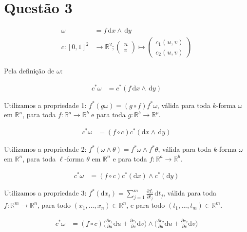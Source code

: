 \documentclass[12pt,a4paper]{article}
\begin{document}
	\section{Quest\~ao 3}
		
		\begin{align}
			\omega &= f \,\mathrm{d}x \wedge \,\mathrm{d}y \\
			c : [0,1]^2 &\rightarrow \mathbb{R}^2 ; \begin{pmatrix} u \\ v \end{pmatrix} \mapsto \begin{pmatrix} c_1(u,v) \\ c_2(u,v) \end{pmatrix}
		\end{align}		

		Pela defini\c{c}\~ao de $\omega$:
		
		\begin{align}
			c^*\omega &= c^*(f \,\mathrm{d}x \wedge \,\mathrm{d}y)
		\end{align}		
		
		Utilizamos a propriedade 1: $f^*(g \omega) = (g \circ f) f^*\omega$, v\'alida para toda $k$-forma $\omega$ em $\mathbb{R}^n$, para toda $f : \mathbb{R}^a \rightarrow \mathbb{R}^b$ e para toda $g : \mathbb{R}^b \rightarrow \mathbb{R}^p$.

		\begin{align}
			c^*\omega &= (f \circ c) c^*(\mathrm{d}x \wedge \,\mathrm{d}y)
		\end{align}		
		
		Utilizamos a propriedade 2: $f^*(\omega \wedge \theta) = f^*\omega \wedge f^*\theta$, v\'alida para toda $k$-forma $\omega$ em $\mathbb{R}^n$, para toda $\ell$-forma $\theta$ em $\mathbb{R}^n$ e para toda $f : \mathbb{R}^a \rightarrow \mathbb{R}^b$.
		
		\begin{align}
			c^*\omega &= (f \circ c) c^*(\mathrm{d}x) \wedge c^*(\mathrm{d}y)
		\end{align}		
		
		Utilizamos a propriedade 3: $f^*(\mathrm{d}x_i) = \sum_{j = 1}^m \frac{\partial f_i}{\partial t_j} \,\mathrm{d}t_j$, v\'alida para toda $f : \mathbb{R}^m \rightarrow \mathbb{R}^n$, para todo $(x_1, ..., x_n) \in \mathbb{R}^n$, e para todo $(t_1, ..., t_m) \in \mathbb{R}^m$.
		
		\begin{align}
			c^*\omega &= (f \circ c) \biggl(\frac{\partial c_1}{\partial u}\mathrm{d}u + \frac{\partial c_1}{\partial v}\mathrm{d}v\biggl) \wedge \biggl(\frac{\partial c_2}{\partial u}\mathrm{d}u + \frac{\partial c_2}{\partial v}\mathrm{d}v \biggl)
		\end{align}		
		
\end{document}
